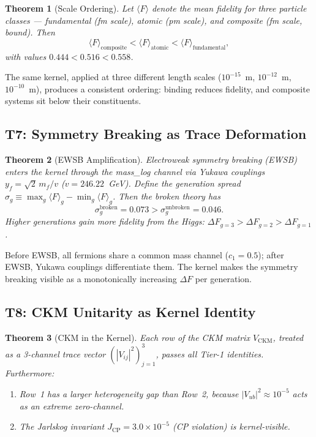 \documentclass[
  aps,
  prd,
  twocolumn,
  superscriptaddress,
  nofootinbib,
  floatfix
]{revtex4-2}
\newtheorem{theorem}{Theorem}
\newcommand{\beq}{\begin{equation}}
\newcommand{\eeq}{\end{equation}}
\begin{document}
\begin{theorem}[Scale Ordering]\label{thm:T6}
Let $\langle F \rangle$ denote the mean fidelity for three
particle classes --- fundamental (fm scale), atomic (pm scale),
and composite (fm scale, bound).  Then
\beq
  \langle F \rangle_{\text{composite}} <
  \langle F \rangle_{\text{atomic}} <
  \langle F \rangle_{\text{fundamental}},
\eeq
with values $0.444 < 0.516 < 0.558$.
\end{theorem}

The same kernel, applied at three different length scales
($10^{-15}$~m, $10^{-12}$~m, $10^{-10}$~m), produces a
consistent ordering: binding reduces fidelity, and composite
systems sit below their constituents.

\subsection{T7: Symmetry Breaking as Trace Deformation}

\begin{theorem}[EWSB Amplification]\label{thm:T7}
Electroweak symmetry breaking (EWSB) enters the kernel through
the mass\_log channel via Yukawa couplings
$y_f = \sqrt{2}\,m_f / v$ ($v = 246.22$~GeV).  Define the
generation spread $\sigma_g \equiv \max_g \langle F \rangle_g
- \min_g \langle F \rangle_g$.  Then the broken theory has
\beq
  \sigma_g^{\text{broken}} = 0.073 > \sigma_g^{\text{unbroken}} = 0.046.
\eeq
Higher generations gain more fidelity from the Higgs:
$\Delta F_{g=3} > \Delta F_{g=2} > \Delta F_{g=1}$.
\end{theorem}

Before EWSB, all fermions share a common mass channel
($c_1 = 0.5$); after EWSB, Yukawa couplings differentiate
them.  The kernel makes the symmetry breaking visible as a
monotonically increasing $\Delta F$ per generation.

\subsection{T8: CKM Unitarity as Kernel Identity}

\begin{theorem}[CKM in the Kernel]\label{thm:T8}
Each row of the CKM matrix $V_{\text{CKM}}$, treated as a
3-channel trace vector $(|V_{ij}|^2)_{j=1}^3$, passes all
Tier-1 identities.  Furthermore:
\begin{enumerate}
\item Row~1 has a larger heterogeneity gap than Row~2, because
      $|V_{ub}|^2 \approx 10^{-5}$ acts as an extreme
      zero-channel.
\item The Jarlskog invariant $J_{\text{CP}} = 3.0 \times 10^{-5}$
      (CP violation) is kernel-visible.
\end{enumerate}
\end{theorem}
\end{document}
